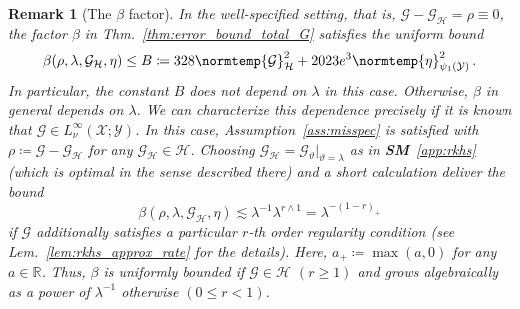 \documentclass{article}
\theoremstyle{plain}
\theoremstyle{my_def}
\theoremstyle{my_rem}
\newtheorem{remark}[theorem]{Remark}
\numberwithin{equation}{section}
\numberwithin{theorem}{section}%
\newcommand{\R}{\mathbb{R}}
\newcommand{\cG}{\mathcal{G}}
\newcommand{\cH}{\mathcal{H}}
\newcommand{\cX}{\mathcal{X}}
\newcommand{\cY}{\mathcal{Y}}
\newcommand{\norm}{\normtemp}
\newcommand{\defeq}{\coloneqq} %
\newcommand{\mmin}{\wedge} %
\newcommand{\GH}{\cG_{\cH}}
\begin{document}
\begin{remark}[The $\beta$ factor]
    In the well-specified setting, that is, $\cG-\GH=\rho\equiv 0$, the factor $\beta$ in Thm.~\eqref{thm:error_bound_total_G} satisfies the uniform bound
    \begin{equation}\label{eq:beta_well}
        \beta(\rho,\lambda,\GH,\eta)\leq B\defeq 328\norm{\cG}_\cH^2 + 2023e^{3}\norm{\eta}_{\psi_1(\cY)}^2\,.
    \end{equation}
    In particular, the constant $B$ does not depend on $\lambda$ in this case. Otherwise, $\beta$ in general depends on $\lambda$. We can characterize this dependence precisely if it is known that $\cG\in L^\infty_\nu(\cX;\cY)$. In this case, Assumption~\ref{ass:misspec} is satisfied with $\rho\defeq \cG-\GH$ \emph{for any} $\GH\in\cH$. Choosing $\GH=\cG_\vartheta|_{\vartheta=\lambda}$ as in {\bf SM}~\ref{app:rkhs} (which is optimal in the sense described there) and a short calculation deliver the bound
    \begin{equation}\label{eq:beta_misspec}
        \beta(\rho,\lambda,\GH,\eta)\lesssim \lambda^{-1}\lambda^{r\mmin 1} = \lambda^{-(1-r)_{+}}
    \end{equation}
    if $\cG$ additionally satisfies a particular $r$-th order regularity condition (see Lem.~\ref{lem:rkhs_approx_rate} for the details). Here, $a_+\defeq\max(a,0)$ for any $a\in\R$. Thus, $\beta$ is uniformly bounded if $\cG\in\cH$ $(r\geq 1)$  and grows algebraically as a power of $\lambda^{-1}$ otherwise $(0\leq r<1)$.
\end{remark}
\end{document}
